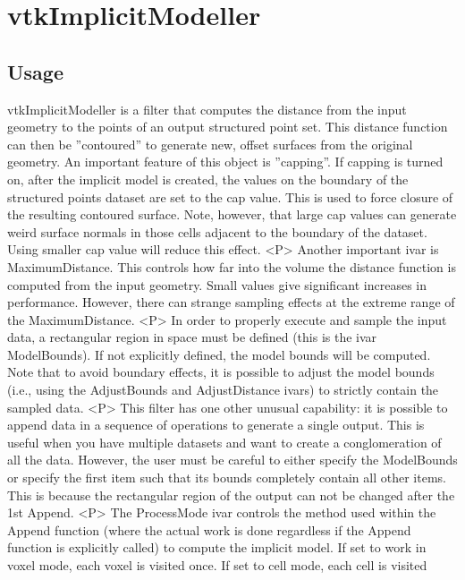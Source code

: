 \section{vtkImplicitModeller}

\subsection{Usage}

 vtkImplicitModeller is a filter that computes the distance from the input
 geometry to the points of an output structured point set. This distance
 function can then be ''contoured'' to generate new, offset surfaces from
 the original geometry. An important feature of this object is
 ''capping''. If capping is turned on, after the implicit model is created,
 the values on the boundary of the structured points dataset are set to
 the cap value. This is used to force closure of the resulting contoured
 surface. Note, however, that large cap values can generate weird surface
 normals in those cells adjacent to the boundary of the dataset. Using
 smaller cap value will reduce this effect.
<P>
 Another important ivar is MaximumDistance. This controls how far into the
 volume the distance function is computed from the input geometry.  Small
 values give significant increases in performance. However, there can
 strange sampling effects at the extreme range of the MaximumDistance.
<P>
 In order to properly execute and sample the input data, a rectangular
 region in space must be defined (this is the ivar ModelBounds).  If not
 explicitly defined, the model bounds will be computed. Note that to avoid
 boundary effects, it is possible to adjust the model bounds (i.e., using
 the AdjustBounds and AdjustDistance ivars) to strictly contain the
 sampled data.
<P>
 This filter has one other unusual capability: it is possible to append
 data in a sequence of operations to generate a single output. This is
 useful when you have multiple datasets and want to create a
 conglomeration of all the data.  However, the user must be careful to
 either specify the ModelBounds or specify the first item such that its
 bounds completely contain all other items.  This is because the 
 rectangular region of the output can not be changed after the 1st Append.
<P>
 The ProcessMode ivar controls the method used within the Append function
 (where the actual work is done regardless if the Append function is
 explicitly called) to compute the implicit model.  If set to work in voxel
 mode, each voxel is visited once.  If set to cell mode, each cell is visited

